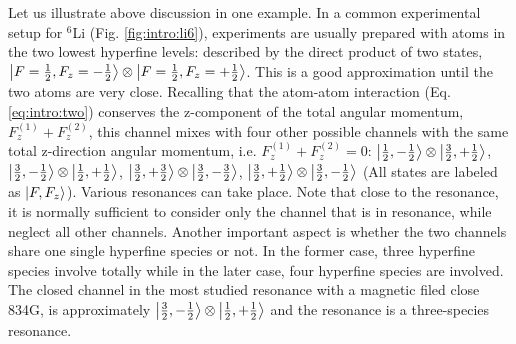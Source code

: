 Let us illustrate above discussion in  one example.  In a common experimental setup for $^{6}$Li (Fig. \ref{fig:intro:li6}), experiments are usually  prepared with atoms in the two lowest hyperfine levels: described by the  direct product of two states, $\left|F=\frac{1}{2},F_{z}=-\frac{1}{2}\right>\otimes\left|F=\frac{1}{2},F_{z}=+\frac{1}{2}\right>$.  This is a good approximation until the two atoms are very close.  Recalling that the atom-atom interaction (Eq. \ref{eq:intro:two}) conserves the z-component of the total angular momentum, $F_{z}^{(1)}+F_{z}^{(2)}$, this channel mixes with four other possible channels with the same total z-direction angular momentum, i.e. $F_{z}^{(1)}+F_{z}^{(2)}=0$: $\left|\frac{1}{2},-\frac{1}{2}\right>\otimes\left|\frac{3}{2},+\frac{1}{2}\right>$, $\left|\frac{3}{2},-\frac{1}{2}\right>\otimes\left|\frac{1}{2},+\frac{1}{2}\right>$, $\left|\frac{3}{2},+\frac{3}{2}\right>\otimes\left|\frac{3}{2},-\frac{3}{2}\right>$, $\left|\frac{3}{2},+\frac{1}{2}\right>\otimes\left|\frac{3}{2},-\frac{1}{2}\right>$ (All states are labeled as $\left|F,F_{z}\right>$).  Various resonances can take place.  Note that close to the resonance, it is normally sufficient to consider only the  channel that is in resonance, while neglect all other channels.  Another important aspect is whether the two channels share one single hyperfine species or not.  In the former case, three hyperfine species involve totally while in the later case, four hyperfine species are involved.   The closed channel in the most studied resonance with a magnetic filed close 834G, is approximately $\left|\frac{3}{2},-\frac{1}{2}\right>\otimes\left|\frac{1}{2},+\frac{1}{2}\right>$ and the resonance is a three-species resonance\cite{ZhangThesis,ChinRMP}. 

